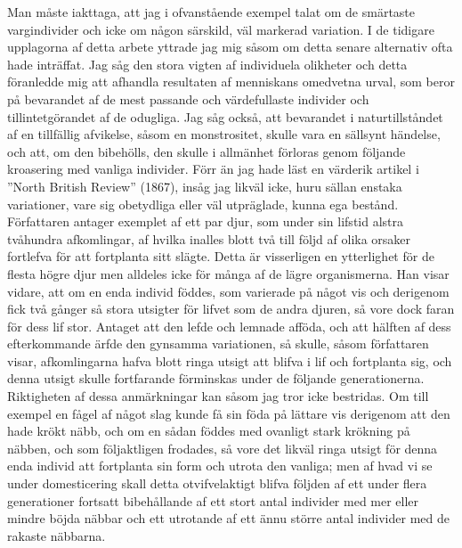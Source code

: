 Man måste iakttaga, att jag i ofvanstående exempel talat om de smärtaste vargindivider och icke om någon särskild, väl markerad variation. I de tidigare upplagorna af detta arbete yttrade jag mig såsom om detta senare alternativ ofta hade inträffat. Jag såg den stora vigten af individuela olikheter och detta föranledde mig att afhandla resultaten af menniskans omedvetna urval, som beror på bevarandet af de mest passande och värdefullaste individer och tillintetgörandet af de odugliga. Jag såg också, att bevarandet i naturtillståndet af en tillfällig afvikelse, såsom en monstrositet, skulle vara en sällsynt händelse, och att, om den bibehölls, den skulle i allmänhet förloras genom följande kroasering med vanliga individer. Förr än jag hade läst en värderik artikel i ”North British Review” (1867), insåg jag likväl icke, huru sällan enstaka variationer, vare sig obetydliga eller väl utpräglade, kunna ega bestånd. Författaren antager exemplet af ett par djur, som under sin lifstid alstra tvåhundra afkomlingar, af hvilka inalles blott två till följd af olika orsaker fortlefva för att fortplanta sitt slägte. Detta är visserligen en ytterlighet för de flesta högre djur men alldeles icke för många af de lägre organismerna. Han visar vidare, att om en enda individ föddes, som varierade på något vis och derigenom fick två gånger så stora utsigter för lifvet som de andra djuren, så vore dock faran för dess lif stor. Antaget att den lefde och lemnade afföda, och att hälften af dess efterkommande ärfde den gynsamma variationen, så skulle, såsom författaren visar, afkomlingarna hafva blott ringa utsigt att blifva i lif och fortplanta sig, och denna utsigt skulle fortfarande förminskas under de följande generationerna. Riktigheten af dessa anmärkningar kan såsom jag tror icke bestridas. Om till exempel en fågel af något slag kunde få sin föda på lättare vis derigenom att den hade krökt näbb, och om en sådan föddes med ovanligt stark krökning på näbben, och som följaktligen frodades, så vore det likväl ringa utsigt för denna enda individ att fortplanta sin form och utrota den vanliga; men af hvad vi se under domesticering skall detta otvifvelaktigt blifva följden af ett under flera generationer fortsatt bibehållande af ett stort antal individer med mer eller mindre böjda näbbar och ett utrotande af ett ännu större antal individer med de rakaste näbbarna.

